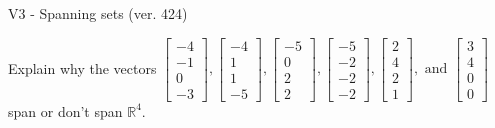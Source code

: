 \begin{exercise}
  \begin{exerciseTitle}V3 - Spanning sets (ver. 424)\end{exerciseTitle}
  \begin{exerciseStatement}
    Explain why the vectors \(\left[\begin{array}{r}
-4 \\
-1 \\
0 \\
-3
\end{array}\right] , \left[\begin{array}{r}
-4 \\
1 \\
1 \\
-5
\end{array}\right] , \left[\begin{array}{r}
-5 \\
0 \\
2 \\
2
\end{array}\right] , \left[\begin{array}{r}
-5 \\
-2 \\
-2 \\
-2
\end{array}\right] , \left[\begin{array}{r}
2 \\
4 \\
2 \\
1
\end{array}\right] , \text{ and } \left[\begin{array}{r}
3 \\
4 \\
0 \\
0
\end{array}\right]\) span or don't span \(\mathbb{R}^4\). 
	



\end{exerciseStatement}
\end{exercise}
